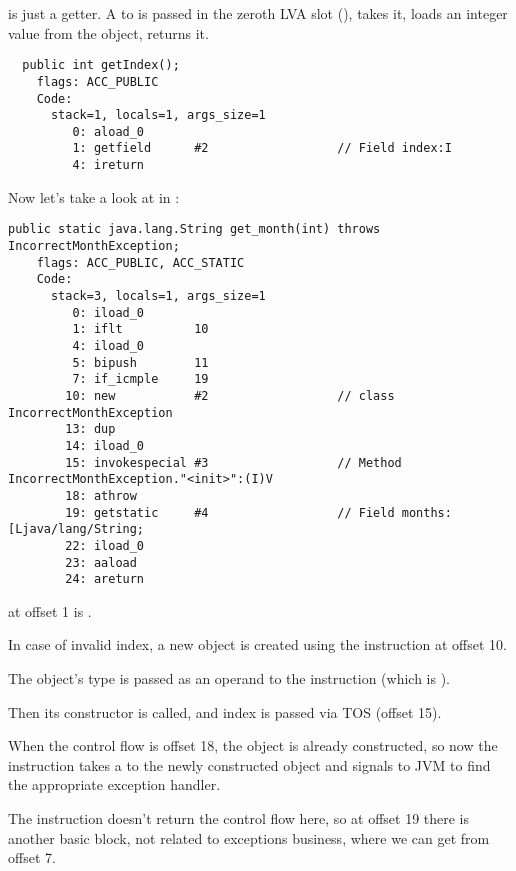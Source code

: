  is just a getter.
A  to  is passed in the zeroth \ac{LVA} slot
(),  takes it,  loads an integer value from the object, 
 returns it.

\begin{lstlisting}
  public int getIndex();
    flags: ACC_PUBLIC
    Code:
      stack=1, locals=1, args_size=1
         0: aload_0       
         1: getfield      #2                  // Field index:I
         4: ireturn       
\end{lstlisting}

Now let's take a look at  in :

\begin{lstlisting}[caption=Month2.class]
  public static java.lang.String get_month(int) throws IncorrectMonthException;
    flags: ACC_PUBLIC, ACC_STATIC
    Code:
      stack=3, locals=1, args_size=1
         0: iload_0       
         1: iflt          10
         4: iload_0       
         5: bipush        11
         7: if_icmple     19
        10: new           #2                  // class IncorrectMonthException
        13: dup           
        14: iload_0       
        15: invokespecial #3                  // Method IncorrectMonthException."<init>":(I)V
        18: athrow        
        19: getstatic     #4                  // Field months:[Ljava/lang/String;
        22: iload_0       
        23: aaload        
        24: areturn       
\end{lstlisting}

 at offset 1 is .

In case of invalid index, a new object is created using the  instruction at offset 10.

The object's type is passed as an operand to the instruction (which is ).

Then its constructor is called, and index is passed via \ac{TOS} (offset 15).

When the control flow is offset 18, the object is already constructed, 
so now the  instruction takes a  
to the newly constructed object and signals to \ac{JVM} to find the appropriate exception handler.

The  instruction doesn't return the control flow here, 
so at offset 19 there is another \gls{basic block},
not related to exceptions business, where we can get from offset 7.

